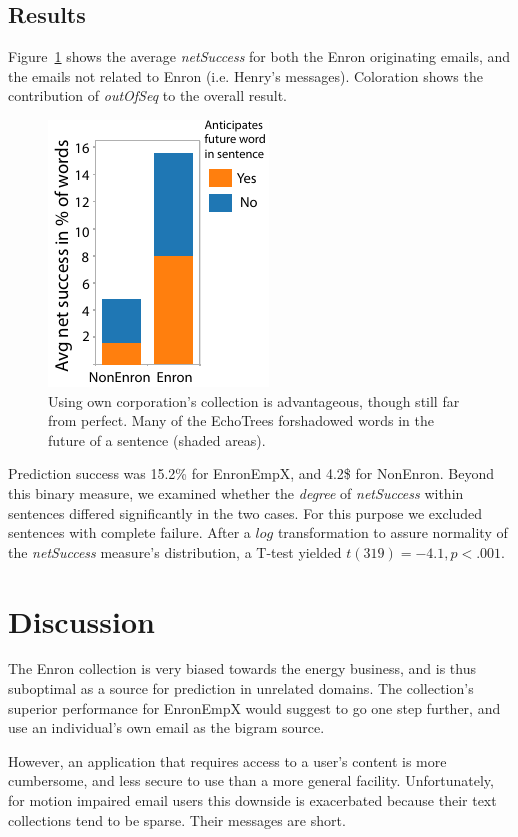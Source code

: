 \documentclass{sigchi}
\begin{document}
\subsection{Results}
Figure~\ref{fig:netSuccess} shows the average {\em netSuccess} for
both the Enron originating emails, and the emails not related to Enron
(i.e. Henry's messages). Coloration shows the contribution of {\em
  outOfSeq} to the overall result.
\begin{figure}
   \centering
   \includegraphics{Figs/relativeNetSuccessBarGraphCleanedSmall.pdf}
   \caption{Using own corporation's collection is advantageous, though
     still far from perfect. Many of the EchoTrees forshadowed words
     in the future of a sentence (shaded areas).}
   \label{fig:netSuccess}
\end{figure}
Prediction success was 15.2\% for EnronEmpX, and 4.2\$ for
NonEnron. Beyond this binary measure, we examined whether the {\em
  degree} of {\em netSuccess} within sentences differed significantly
in the two cases. For this purpose we excluded sentences with complete
failure. After a $log$ transformation to assure normality of the {\em
  netSuccess} measure's distribution, a T-test yielded $t(319)=-4.1,
p<.001$.
\section{Discussion}
The Enron collection is very biased towards the energy business, and
is thus suboptimal as a source for prediction in unrelated
domains. The collection's superior performance for EnronEmpX would
suggest to go one step further, and use an individual's own email as
the bigram source. 

However, an application that requires access to a user's content is
more cumbersome, and less secure to use than a more general facility.
Unfortunately, for motion impaired email users this downside is
exacerbated because their text collections tend to be sparse.
Their messages are short.
\end{document}
